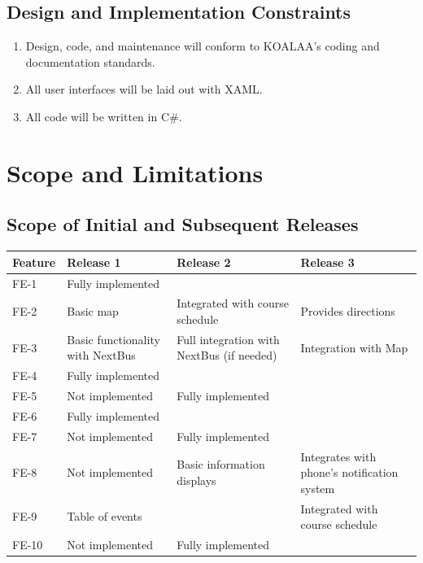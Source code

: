\documentclass[pdftex,12pt,letter]{article}
\begin{document}
\subsection{Design and Implementation Constraints}
\begin{enumerate}[CO-1:]
\item Design, code, and maintenance will conform to KOALAA's coding and documentation standards.
\item All user interfaces will be laid out with XAML.
\item All code will be written in C\#.
\end{enumerate}
\section{Scope and Limitations}
\subsection{Scope of Initial and Subsequent Releases}
\begin{table}[h]
\begin{tabularx}{\textwidth }[t]{|l|Y|Y|Y|}
\hline
\bfseries Feature & \bfseries\hspace{1cm}Release 1 & \bfseries\hspace{1cm}Release 2 & \bfseries\hspace{1cm}Release 3 \\ \hline
FE-1 & Fully implemented & ~ & ~ \\ \hline
FE-2 & Basic map & Integrated with course schedule & Provides directions \\ \hline
FE-3 & Basic functionality with NextBus & Full integration with NextBus (if needed) & Integration with Map \\ \hline
FE-4 & Fully implemented & ~ & ~ \\ \hline
FE-5 & Not implemented & Fully implemented & ~ \\ \hline
FE-6 & Fully implemented & ~ & ~ \\ \hline
FE-7 & Not implemented & Fully implemented & ~ \\ \hline
FE-8 & Not implemented & Basic information displays & Integrates with phone's notification system \\ \hline
FE-9 & Table of events & ~ & Integrated with course schedule \\ \hline
FE-10 & Not implemented & Fully implemented & ~ \\
\hline
\end{tabularx}
\end{table}
\end{document}
